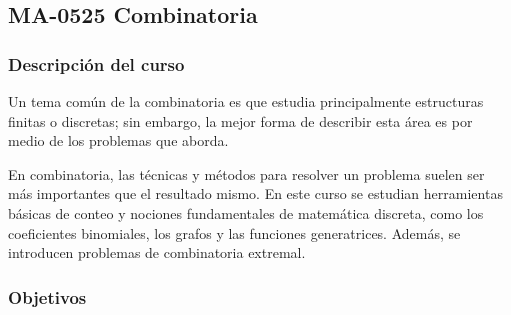 \newpage
\subsection*{MA-0525 Combinatoria}

\hypertarget{MA0525}{}
\begin{refsection}
\begin{table}[H]
\end{table}

\subsubsection*{Descripción del curso}

Un tema común de la combinatoria es que estudia principalmente estructuras finitas o discretas; sin embargo, la mejor forma de describir esta área es por medio de los problemas que aborda.

En combinatoria, las técnicas y métodos para resolver un problema suelen ser más importantes que el resultado mismo. En este curso se estudian herramientas básicas de conteo y nociones fundamentales de matemática discreta, como los coeficientes binomiales, los grafos y las funciones generatrices. Además, se introducen problemas de combinatoria extremal.

\subsubsection*{Objetivos}


\end{refsection}
